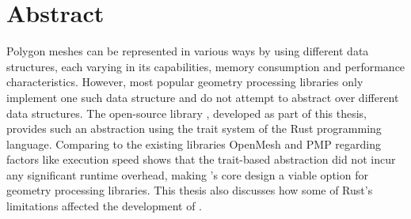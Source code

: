 \chapter*{\hfill Abstract}


Polygon meshes can be represented in various ways by using different data structures, each varying in its capabilities, memory consumption and performance characteristics.
However, most popular geometry processing libraries only implement one such data structure and do not attempt to abstract over different data structures.
The open-source library , developed as part of this thesis, provides such an abstraction using the trait system of the Rust programming language.
Comparing  to the existing libraries OpenMesh and PMP regarding factors like execution speed shows that the trait-based abstraction did not incur any significant runtime overhead, making 's core design a viable option for geometry processing libraries.
This thesis also discusses how some of Rust's limitations affected the development of .




%





















